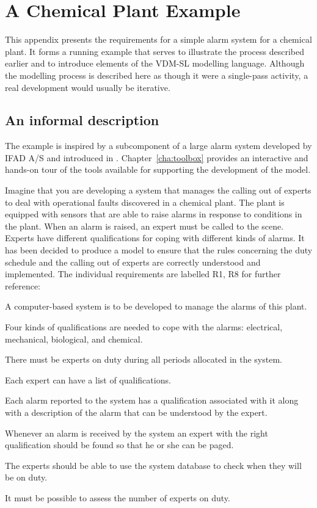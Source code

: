 \appendix

\chapter{A Chemical Plant Example}\label{app:alarm}

This appendix presents the requirements for a simple alarm system for a
chemical plant. It forms a running example that serves to illustrate
the process described earlier and to introduce elements of the VDM-SL
modelling language. Although the modelling process is described here
as though it were a single-pass activity, a real development would
usually be iterative. 


\section{An informal description}



The example is inspired by a subcomponent of a large
alarm system developed by IFAD A/S and introduced in 
\cite{Fitzgerald&98b}. 
Chapter~\ref{cha:toolbox} provides an interactive and hands-on tour of
the tools available for supporting the development of the model.

Imagine that you are developing a system that manages the calling out
of experts to deal with operational faults discovered in a chemical
plant.  The plant is equipped with sensors that are able to raise
alarms in response to conditions in the plant.  When an alarm is
raised, an expert must be called to the scene.  Experts have different
qualifications for coping with different kinds of alarms. It has been
decided to produce a model to ensure that the rules
concerning the duty schedule and the calling out of experts are
correctly understood and implemented. The individual requirements are
labelled R1, R8 for further reference:

\begin{reqs}
\item A computer-based system is to be developed to manage the alarms 
of this plant.
\item Four kinds of qualifications are needed to cope with the alarms: 
 electrical, mechanical, biological, and chemical.
\item There must be experts on duty during all periods allocated in 
the system.
\item Each expert can have a list of qualifications.
\item Each alarm reported to the system has a qualification associated 
with it along with a description of the alarm that can be understood 
by the expert.
\item Whenever an alarm is received by the system an expert with the 
right qualification should be found so that he or she can be 
paged.
\item The experts should be able to use the system database to check 
when they will be on duty.
\item It must be possible to assess the number of experts on duty.
\end{reqs}

